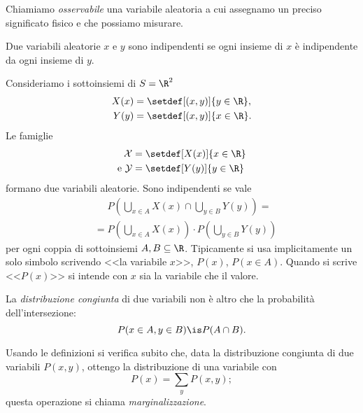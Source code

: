 \begin{definition}[Osservabile]
	Chiamiamo \emph{osservabile} una variabile aleatoria a cui assegnamo un preciso significato fisico e che possiamo misurare.
\end{definition}

\begin{definition}
	Due variabili aleatorie $x$ e $y$ sono indipendenti se ogni insieme di $x$ è indipendente da ogni insieme di $y$.
\end{definition}

\begin{example}
	Consideriamo i sottoinsiemi di $S=\R^2$
	\begin{align*}
		X(x) &= \setdef[(x,y)]{y\in\R}, \\
		Y(y) &= \setdef[(x,y)]{x\in\R}.
	\end{align*}
	Le famiglie
	\begin{align*}
		\mathcal X &= \setdef[X(x)]{x\in\R} \\
		\text{e }\mathcal Y &= \setdef[Y(y)]{y\in\R}
	\end{align*}
	formano due variabili aleatorie.
	Sono indipendenti se vale
	\begin{align*}
		&\phantom{{}={}} P\left( \bigcup_{x\in A} X(x) \cap \bigcup_{y\in B} Y(y) \right) = \\
		&= P\left( \bigcup_{x\in A} X(x) \right) \cdot P\left( \bigcup_{y\in B} Y(y) \right)
	\end{align*}
	per ogni coppia di sottoinsiemi $A,B\subseteq\R$.
	Tipicamente si usa implicitamente un solo simbolo scrivendo
	<<la variabile $x$>>, $P(x)$, $P(x\in A)$.
	Quando si scrive <<$P(x)$>> si intende con $x$ sia la variabile che il valore.
\end{example}

\begin{definition}
	La \emph{distribuzione congiunta} di due variabili non è altro che
	la probabilità dell'intersezione:
	\begin{equation*}
		P(x\in A,y\in B)
		\is P(A\cap B).
	\end{equation*}
\end{definition}

\begin{definition}[Marginalizzazione]
	Usando le definizioni si verifica subito che, data la distribuzione congiunta di due variabili $P(x,y)$,
	ottengo la distribuzione di una variabile con
	\begin{equation*}
		P(x) = \sum_y P(x,y);
	\end{equation*}
	questa operazione si chiama \emph{marginalizzazione}.
\end{definition}

